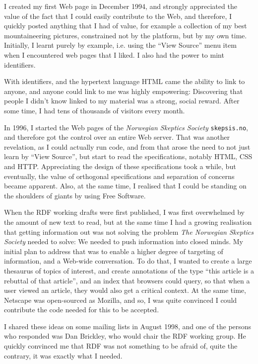 I created my first Web page in December 1994, and strongly appreciated
the value of the fact that I could easily contribute to the Web, and
therefore, I quickly posted anything that I had of value, for example
a collection of my best mountaineering pictures, constrained not by
the platform, but by my own time. Initially, I learnt purely by
example, i.e. using the ``View Source'' menu item when I encountered
web pages that I liked. I also had the power to mint identifiers. 

With identifiers, and the hypertext language HTML came the ability to
link to anyone, and anyone could link to me was highly empowering:
Discovering that people I didn't know linked to my material was a
strong, social reward. After some time, I had tens of thousands of
visitors every month.

In 1996, I started the Web pages of the \textit{Norwegian Skeptics Society}
\texttt{skepsis.no}, and therefore got the control over an entire Web
server. That was another revelation, as I could actually run code, and
from that arose the need to not just learn by ``View Source'', but
start to read the specifications, notably HTML, CSS and
HTTP. Appreciating the design of these specifications took a while,
but eventually, the value of orthogonal specifications and separation
of concerns became apparent. Also, at the same time, I realised that I
could be standing on the shoulders of giants by using Free Software.

When the RDF working drafts were first published, I was first
overwhelmed by the amount of new text to read, but at the same time I
had a growing realisation that getting information out was not solving
the problem \textit{The Norwegian Skeptics Society} needed to solve: We needed
to push information into closed minds. My initial plan to address that
was to enable a higher degree of targeting of information, and a Web-wide
conversation. To do that, I wanted to create a large thesaurus of
topics of interest, and create annotations of the type ``this article
is a rebuttal of that article'', and an index that browsers could
query, so that when a user viewed an article, they would also get a
critical context. At the same time, Netscape was open-sourced as
Mozilla, and so, I was quite convinced I could contribute the code
needed for this to be accepted. 

I shared these ideas on some mailing lists in August 1998, and one of
the persons who responded was Dan Brickley, who would chair the RDF
working group. He quickly convinced me that RDF was not something to
be afraid of, quite the contrary, it was exactly what I needed.

